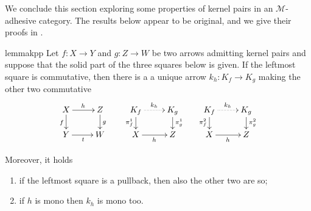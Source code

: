 \documentclass[a4paper,UKenglish,cleveref,pdftex,thm-restate,numberwithinsect]{lipics-v2021}
\def\D{\textbf {\textup{D}}}
\def\X{\textbf {\textup{X}}}
\newcommand{\commentato}[1]{ {} }
\begin{document}
\commentato{ 
\begin{restatable}{corollary}{natepi}\label{cor:reg_epi_components_reg_epi_nat_trans}
    Let $\X$ be a category with pullbacks and $\phi\colon F \to G$ a natural transformation between functors $F, G: \D \rightrightarrows \X$. If $\phi_d$ is a regular epi for every $d$, then $\phi$ is a regular epi.
\end{restatable}

From the previous result we deduce that the class of regular epis is closed under colimits.

\begin{restatable}{lemma}{epicol}\label{lemma:nat_trans_reg_epi_canonical_arrow_reg_epi}
    Let $F,G\colon \D\rightrightarrows \X$ be two diagrams, and suppose that $\X$ has all colimits of shape $\D$. Let $(X, \{x_d\}_{d \in \D})$ and $(Y, \{y_d\}_{d\in D})$ be the colimits of $F$ and $G$, respectively.  If $\phi\colon  F \to G$ is a natural transformation whose components are regular epis, then the arrow induced by $\phi$ from $X$ to $Y$ is a regular epi.
\end{restatable}
}
We conclude this section exploring some properties of kernel pairs in an $\mathcal{M}$-adhesive category. 
The results below appear to be original, and we give their proofs in .

\begin{restatable}{lemma}{kpp}\label{lemma:kern_pairs_pres_pullbacks}
	Let $f\colon X \to Y$ and $g\colon Z \to W$ be two arrows admitting kernel pairs and suppose that the solid part of the three squares below is given. 
	If the leftmost square is commutative, then there is a a unique arrow $k_h: K_f \to K_g$ making the other two commutative
	\[\xymatrix@R=15pt{X \ar[r]^{h}\ar[d]_{f}& Z \ar[d]^{g} & K_f \ar@{.>}[r]^{k_h} \ar[d]_{\pi^1_f}& K_g \ar[d]^{\pi^1_g} & K_f  \ar@{.>}[r]^{k_h} \ar[d]_{\pi^2_f}& K_g \ar[d]^{\pi^2_g}\\ Y \ar[r]_t& W & X \ar[r]_{h} & Z & X\ar[r]_{h} &Z}\]
	
		Moreover, it holds
		\begin{enumerate}
			\item if the leftmost square is a pullback, then also the other two are so;
			\item if $h$ is mono then $k_h$ is mono too.
		\end{enumerate} 
\end{restatable}
\end{document}
